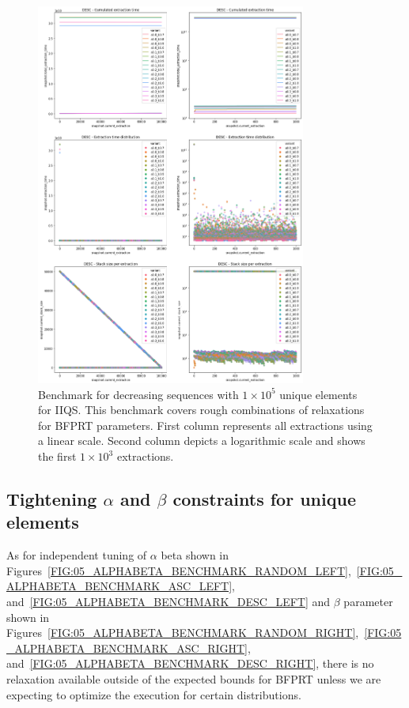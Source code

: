 \begin{figure}[p]
    \centering
    \includegraphics[width=0.79\textwidth]{./fragments/04_experimental_execution/images/04_alphabeta_detail_decreasing.png}
    \caption{Benchmark for decreasing sequences with $1\times10^5$ unique elements for IIQS. This benchmark covers rough combinations of relaxations for BFPRT parameters. First column represents all extractions using a linear scale. Second column depicts a logarithmic scale and shows the first $1\times10^3$ extractions. }
    \label{FIG:05_ALPHABETA_BENCHMARK_DESC}
\end{figure}


\subsection{Tightening $\alpha$ and $\beta$ constraints for unique elements}

As for independent tuning of $\alpha$ beta shown in Figures~\ref{FIG:05_ALPHABETA_BENCHMARK_RANDOM_LEFT},~\ref{FIG:05_ALPHABETA_BENCHMARK_ASC_LEFT}, and~\ref{FIG:05_ALPHABETA_BENCHMARK_DESC_LEFT} and $\beta$ parameter shown in Figures~\ref{FIG:05_ALPHABETA_BENCHMARK_RANDOM_RIGHT},~\ref{FIG:05_ALPHABETA_BENCHMARK_ASC_RIGHT}, and~\ref{FIG:05_ALPHABETA_BENCHMARK_DESC_RIGHT}, there is no relaxation available outside of the expected bounds for BFPRT unless we are expecting to optimize the execution for certain distributions.

